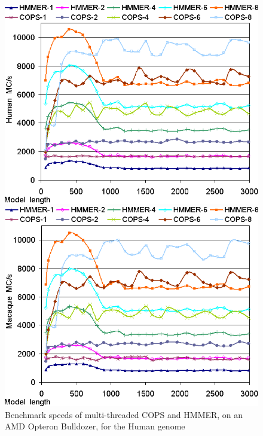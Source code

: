 \clearpage







\begin{figure}[h!]
    \begin{minipage}{0.48\linewidth}
		\centering
		\includegraphics[scale=0.46]{graphics/threads-aleph-runtimes-human.png}
		\caption[Speeds of the multi-threaded COPS and HMMER, AMD Opteron, Human] 
		{Benchmark speeds of multi-threaded COPS and HMMER, on an AMD Opteron Bulldozer, for the Human genome}
		\label{threads-aleph-runtimes-human}
    \end{minipage}
    \hspace{0.04\linewidth}
    \begin{minipage}{0.48\linewidth}
		\centering
		\includegraphics[scale=0.46]{graphics/threads-aleph-runtimes-macaque.png}

\end{minipage}
\end{figure}
